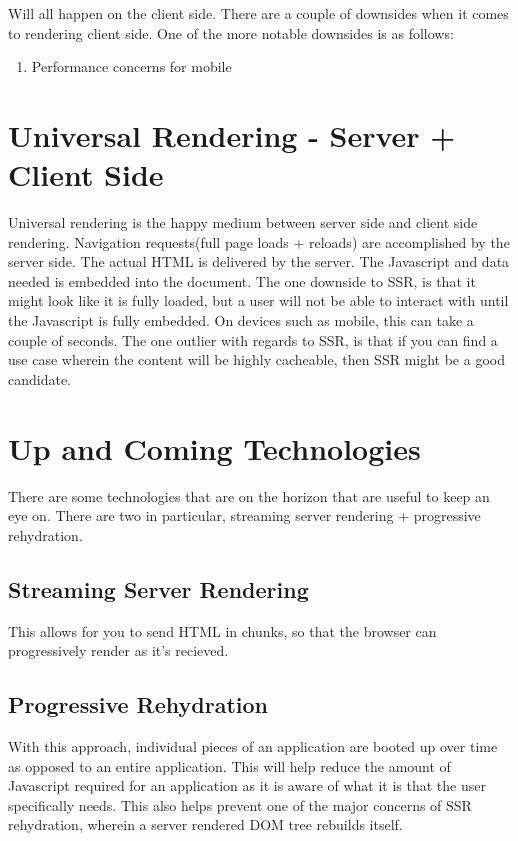 Will all happen on the client side. There are a couple of downsides when it comes to rendering client side. One of the more notable downsides is as follows: 
\begin{enumerate}
  \item Performance concerns for mobile
\end{enumerate}


\section{Universal Rendering - Server + Client Side}
Universal rendering is the happy medium between server side and client side rendering. Navigation requests(full page loads + reloads) are accomplished by the server side. The actual HTML is delivered by the server. The Javascript and data needed is embedded into the document. The one downside to SSR, is that it might look like it is fully loaded, but a user will not be able to interact with until the Javascript is fully embedded. On devices such as mobile, this can take a couple of seconds. The one outlier with regards to SSR, is that if you can find a use case wherein the content will be highly cacheable, then SSR might be a good candidate. 

\section{Up and Coming Technologies}
There are some technologies that are on the horizon that are useful to keep an eye on. There are two in particular, streaming server rendering + progressive rehydration.

\subsection{Streaming Server Rendering}
This allows for you to send HTML in chunks, so that the browser can progressively render as it's recieved. 

\subsection{Progressive Rehydration}
With this approach, individual pieces of an application are booted up over time as opposed to an entire application. This will help reduce the amount of Javascript required for an application as it is aware of what it is that the user specifically needs. This also helps prevent one of the major concerns of SSR rehydration, wherein a server rendered DOM tree rebuilds itself. 


